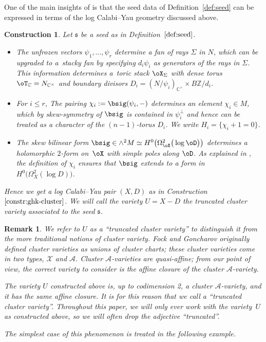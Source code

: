 \documentclass[pdftex]{sigma}%
\numberwithin{equation}{section}
\newtheorem{Construction}[Theorem]{Construction}
\newtheorem{Remark}[Theorem]{Remark} }
\def\CC{\mathbb{C}}
\def\ZZ{\mathbb{Z}}
\newcommand\frs{\mathfrak{s}}
\begin{document}
One of the main insights of \cite{GHK2} is that the seed data of Definition~\ref{def:seed} can be expressed in terms of the log Calabi--Yau geometry discussed above.

\begin{Construction} \label{constr:ghk-cluster-seed}
 Let $\frs$ be a seed as in Definition~$\ref{def:seed}$.
\begin{itemize}\itemsep=0pt
 \item The unfrozen vectors $\psi_1,\dots, \psi_r$ determine a fan of rays $\Sigma$ in $N$, which can be upgraded to a~stacky fan by specifying $d_i\psi_i$ as generators of the rays in $\Sigma$. This information determines a~toric stack $\oX_\Sigma$ with dense torus $\oT_{\CC} = N_{\CC^\times}$ and boundary divisors $D_i = (N/\psi_i)_{\CC^\times}\allowbreak\times B\ZZ/d_i$.
 \item For $i\leq r$, The pairing $\chi_i := \bsig(\psi_i,-)$ determines an element $\chi_i\in M$, which by skew-symmetry of $\bsig$ is contained in $\psi_i^\perp$ and hence can be treated as a character of the $(n-1)$-torus $D_i$. We write $H_i = \{\chi_i + 1=0\}$.
 \item The skew bilinear form $\bsig\in \wedge^2M \simeq H^0\big(\Omega_{\oX}^2\big(\log\oD\big)\big)$ determines a holomorphic $2$-form on~$\oX$ with simple poles along $\oD$. As explained in {\rm \cite[Lemma 3.4]{HK-icm}}, the definition of $\chi_i$ ensures that $\bsig$ extends to a form in $H^0\big(\Omega_X^2(\log D)\big)$.
\end{itemize}
	Hence we get a log Calabi--Yau pair $(X,D)$ as in Construction~$\ref{constr:ghk-cluster}$. We will call the variety $U= X-D$ the {\em truncated cluster variety} associated to the seed $\frs$.
\end{Construction}

\begin{Remark}
 We refer to $U$ as a ``truncated cluster variety'' to distinguish it from the more traditional notions of cluster variety. Fock and Goncharov originally defined cluster varieties as unions of cluster charts; these cluster varieties come in two types, $\mathcal{X}$ and $\mathcal{A}$. Cluster $\mathcal{A}$-varieties are quasi-affine; from our point of view, the correct variety to consider is the affine closure of the cluster $\mathcal{A}$-variety. %

The variety $U$ constructed above is, up to codimension 2, a cluster $\mathcal{A}$-variety, and it has the same affine closure. It is for this reason that we call a ``truncated cluster variety''. Throughout this paper, we will only ever work with the variety~$U$ as constructed above, so we will often drop the adjective ``truncated''.

 The simplest case of this phenomenon is treated in the following example.
\end{Remark}
\end{document}
